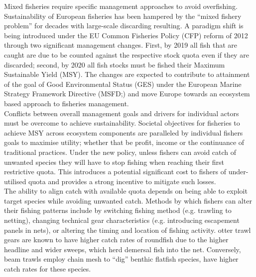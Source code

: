 \documentclass[fleqn,10pt]{wlscirep}
\begin{document}
\begin{linenumbers}
Mixed fisheries require specific management approaches to avoid overfishing.
Sustainability of European fisheries has been hampered by the ``mixed fishery
problem'' for decades with large-scale discarding resulting\cite{Borges2015,
	Uhlmann2014}.  A paradigm shift is being introduced under the EU Common
Fisheries Policy (CFP) reform of 2012 through two significant management
changes.  First, by 2019 all fish that are caught are due to be counted against
the respective stock quota even if they are discarded; second, by 2020 all fish
stocks must be fished   their Maximum Sustainable
Yield (MSY)\cite{EuropeanParliamentandCounciloftheEuropeanUnion2013}. The
changes are expected to contribute to attainment of the goal of Good
Environmental Status (GES) under the European Marine Strategy Framework
Directive (MSFD;\cite{EuropeanParliament2008}) and move Europe towards an
ecosystem based approach to fisheries management\cite{Garcia2003}. \\

Conflicts between overall management goals and drivers for individual actors
must be overcome to achieve sustainability. Societal objectives for fisheries
to achieve MSY across ecosystem components are paralleled by individual fishers
goals to maximise utility; whether that be profit, income or the continuance of
traditional practices.  Under the new policy,
unless fishers can avoid catch of unwanted species they will have to stop
fishing when reaching their first restrictive quota. This introduces a
potential significant cost to fishers of under-utilised quota\cite{Hoff2010a,
	Ulrich2016} and provides a strong incentive to mitigate such
losses\cite{Condie2013, Condie2013a}. \\

The ability to align catch with available quota depends on being able to
exploit target species while avoiding unwanted catch. Methods by which fishers
can alter their fishing patterns include by switching fishing method (e.g.
trawling to netting), changing technical gear characteristics (e.g.
introducing escapement panels in nets), or altering the timing and location of
fishing activity\cite{Fulton2011b, vanPutten2012a}.   otter trawl gears are known to have higher catch rates of
roundfish due to the higher headline and wider sweeps, which herd demersal fish
into the net.  Conversely, beam trawls employ chain mesh to ``dig''
benthic flatfish species, have higher catch rates for these
species\cite{Fraser2008}.  \\


\end{linenumbers}
\end{document}
